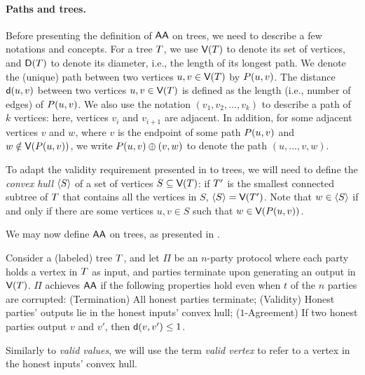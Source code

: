 \paragraph{Paths and trees.} Before presenting the definition of $\textsf{AA}$ on trees, we need to describe a few notations and concepts. For a tree $T$, we use $\textsf{V}(T)$ to denote its set of vertices, and $\textsf{D}(T)$ to denote its diameter, i.e., the length of its longest path. We denote the (unique) path between two vertices $u, v \in \textsf{V}(T)$ by $P(u, v)$.
The distance $\textsf{d}(u, v)$ between two vertices $u, v \in \textsf{V}(T)$ is defined as the length (i.e., number of edges) of $P(u, v)$.
We also use the notation $(v_1, v_2, \ldots, v_k)$ to describe a path of $k$ vertices: here, vertices $v_{i}$ and $v_{i + 1}$ are adjacent. In addition, for some adjacent vertices $v$ and $w$, where $v$ is the endpoint of some path $P(u, v)$ and $w \notin \textsf{V}(P(u, v))$, we write $P(u, v) \oplus (v, w)$ to denote the path $(u, \ldots, v, w)$.

To adapt the validity requirement presented in  to trees, we will need to define the \emph{convex hull} $\langle{S}\rangle$ of a set of vertices $S \subseteq \textsf{V}(T)$: if $T'$ is the smallest connected subtree of $T$ that contains all the vertices in $S$, $\langle{S}\rangle = \textsf{V}(T')$.
Note that $w \in \langle{S}\rangle$ if and only if there are some vertices $u, v \in S$ such that $w \in \textsf{V}(P(u, v))$. 

We may now define $\textsf{AA}$ on trees, as presented in \cite{DISC:NoRy19}.
\begin{definition} \label{def:aa-trees}
Consider a (labeled) tree $T$, and let $\Pi$ be an $n$-party protocol where each party holds a vertex in $T$ as input, and parties terminate upon generating an output in $\textsf{V}(T)$. $\Pi$ achieves $\textsf{AA}$ if the following properties hold even when $t$ of the $n$ parties are corrupted:
(Termination) All honest parties terminate; (Validity) Honest parties' outputs lie in the honest inputs' convex hull; ($1$-Agreement) If two honest parties output $v$ and $v'$, then $\textsf{d}(v, v') \leq 1$.
\end{definition}
Similarly to \emph{valid values}, we will use the term \emph{valid vertex} to refer to a vertex in the honest inputs' convex hull.